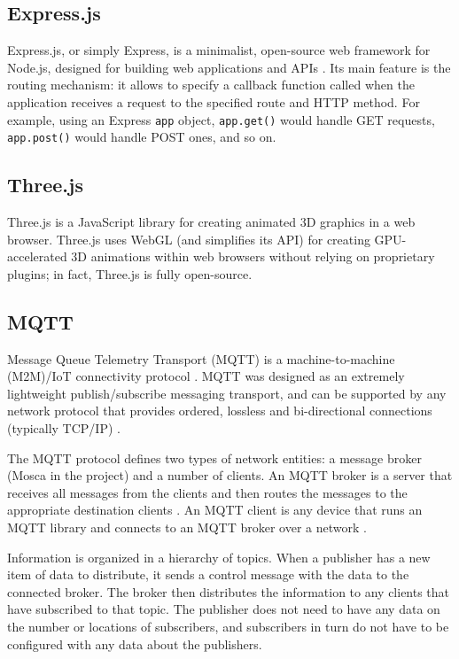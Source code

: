 \subsection{Express.js}
Express.js, or simply Express, is a minimalist, open-source web framework for Node.js, designed for building web applications and APIs \cite{Express.js}. Its main feature is the routing mechanism: it allows to specify a callback function called when the application receives a request to the specified route and HTTP method. For example, using an Express \texttt{app} object, \texttt{app.get()} would handle GET requests, \texttt{app.post()} would handle POST ones, and so on.

\subsection{Three.js}
Three.js is a JavaScript library for creating animated 3D graphics in a web browser. Three.js uses WebGL (and simplifies its API) for creating GPU-accelerated 3D animations within web browsers without relying on proprietary plugins; in fact, Three.js is fully open-source.

\subsection{MQTT}
Message Queue Telemetry Transport (MQTT) is a machine-to-machine (M2M)/IoT connectivity protocol \cite{MQTT}. MQTT was designed as an extremely lightweight publish/subscribe messaging transport, and can be supported by any network protocol that provides ordered, lossless and bi-directional connections (typically TCP/IP) \cite{MQTTDoc}.

The MQTT protocol defines two types of network entities: a message broker (Mosca in the project) and a number of clients. An MQTT broker is a server that receives all messages from the clients and then routes the messages to the appropriate destination clients \cite{KnowMQTT}. An MQTT client is any device that runs an MQTT library and connects to an MQTT broker over a network \cite{ClientBroker}.

Information is organized in a hierarchy of topics. When a publisher has a new item of data to distribute, it sends a control message with the data to the connected broker. The broker then distributes the information to any clients that have subscribed to that topic. The publisher does not need to have any data on the number or locations of subscribers, and subscribers in turn do not have to be configured with any data about the publishers.

